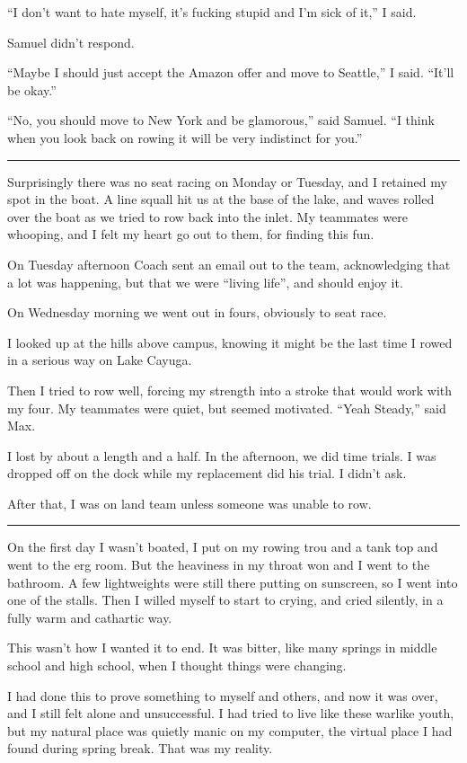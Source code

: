 ``I don't want to hate myself, it's fucking stupid and I'm sick of it,'' I said.  

Samuel didn't respond.

``Maybe I should just accept the Amazon offer and move to Seattle,'' I said.
``It'll be okay.''

``No, you should move to New York and be glamorous,'' said Samuel.  ``I think
when you look back on rowing it will be very indistinct for you.'' 

\plainfancybreak{12pt}{2}{* * *}

Surprisingly there was no seat racing on Monday or Tuesday, and I retained my
spot in the boat.  A line squall hit us at the base of the lake, and waves
rolled over the boat as we tried to row back into the inlet.  My teammates were
whooping, and I felt my heart go out to them, for finding this fun.

On Tuesday afternoon Coach sent an email out to the team, acknowledging that a
lot was happening, but that we were ``living life'', and should enjoy it.

On Wednesday morning we went out in fours, obviously to seat race.

I looked up at the hills above campus, knowing it might be the last time I rowed
in a serious way on Lake Cayuga.  

Then I tried to row well, forcing my strength into a stroke that would work with
my four.  My teammates were quiet, but seemed motivated. ``Yeah Steady,'' said
Max.

I lost by about a length and a half.  In the afternoon, we did time trials.  I
was dropped off on the dock while my replacement did his trial.  I didn't ask.

After that, I was on land team unless someone was unable to row.
 
\plainfancybreak{12pt}{2}{* * *}

On the first day I wasn't boated, I put on my rowing trou and a tank top and
went to the erg room.  But the heaviness in my throat won and I went to the
bathroom.  A few lightweights were still there putting on sunscreen, so I went
into one of the stalls.  Then I willed myself to start to crying, and cried
silently, in a fully warm and cathartic way.  

This wasn't how I wanted it to end.  It was bitter, like many springs in middle
school and high school, when I thought things were changing.  

I had done this to prove something to myself and others, and now it was over,
and I still felt alone and unsuccessful.  I had tried to live like these warlike
youth, but my natural place was quietly manic on my computer, the virtual place
I had found during spring break.  That was my reality.

